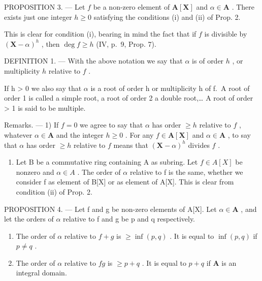 PROPOSITION 3. --- Let \(f\) be a non-zero element of \(\mathbf{A}[\mathbf{X}]\) and \(\alpha \in \mathbf{A}\) . There exists just one integer \(h \geqslant 0\) satisfying the conditions (i) and (ii) of Prop. 2.

This is clear for condition (i), bearing in mind the fact that if \(f\) is divisible by \((\mathbf{X} - \alpha)^h\) , then \(\deg f \geqslant h\) (IV, p.~9, Prop. 7).

DEFINITION 1. --- With the above notation we say that \(\alpha\) is of order \(h\) , or multiplicity \(h\) relative to \(f\) .

If h \textgreater{} 0 we also say that \(\alpha\) is a root of order h or multiplicity h of f.~A root of order 1 is called a simple root, a root of order 2 a double root,\ldots{} A root of order \textgreater{} 1 is said to be multiple.

Remarks. --- 1) If \(f=0\) we agree to say that \(\alpha\) has order \(\geqslant h\) relative to \(f\) , whatever \(\alpha\in\mathbf{A}\) and the integer \(h\geqslant0\) . For any \(f\in\mathbf{A}[\mathbf{X}]\) and \(\alpha\in\mathbf{A}\) , to say that \(\alpha\) has order \(\geqslant h\) relative to \(f\) means that \((\mathbf{X}-\alpha)^{h}\) divides \(f\) .

\begin{enumerate}
\def\labelenumi{\arabic{enumi})}
\setcounter{enumi}{1}
\tightlist
\item
  Let B be a commutative ring containing A as subring. Let \(f \in A[X]\) be nonzero and \(\alpha \in A\) . The order of \(\alpha\) relative to f is the same, whether we consider f as element of B{[}X{]} or as element of A{[}X{]}. This is clear from condition (ii) of Prop. 2.
\end{enumerate}

PROPOSITION 4. --- Let f and g be non-zero elements of A{[}X{]}. Let \(\alpha \in \mathbf{A}\) , and let the orders of \(\alpha\) relative to f and g be p and q respectively.

\begin{enumerate}
\def\labelenumi{(\roman{enumi})}
\item
  The order of \(\alpha\) relative to \(f + g\) is \(\geqslant \inf(p, q)\) . It is equal to \(\inf(p, q)\) if \(p \neq q\) .
\item
  The order of \(\alpha\) relative to \(fg\) is \(\geqslant p + q\) . It is equal to \(p + q\) if \(\mathbf{A}\) is an integral domain.
\end{enumerate}

